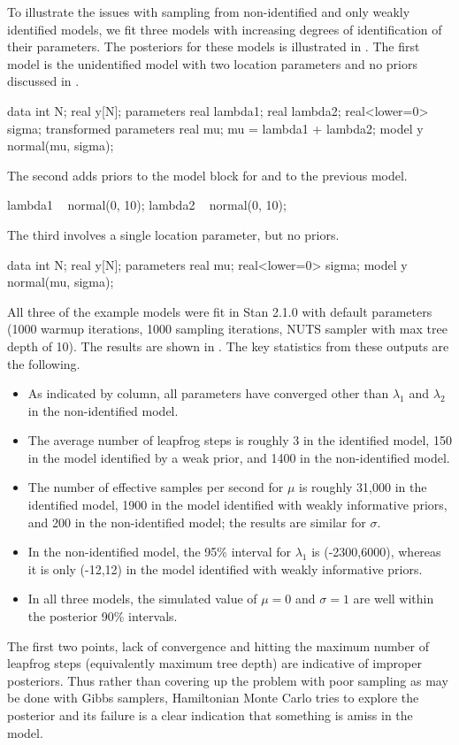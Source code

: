 To illustrate the issues with sampling from non-identified and only
weakly identified models, we fit three models with increasing degrees
of identification of their parameters.  The posteriors for these
models is illustrated in .  The
first model is the unidentified model with two location parameters and
no priors discussed in .
%
\begin{stancode}
data {
  int N;
  real y[N];
}
parameters {
  real lambda1;
  real lambda2;
  real<lower=0> sigma;
}
transformed parameters {
  real mu;
  mu = lambda1 + lambda2;
}
model {
  y ~ normal(mu, sigma);
}
\end{stancode}
%
The second adds priors to the model block for  and
 to the previous model.
%
\begin{stancode}
  lambda1 ~ normal(0, 10);
  lambda2 ~ normal(0, 10);
\end{stancode}
%
The third involves a single location parameter, but no priors.
%
\begin{stancode}
data {
  int N;
  real y[N];
}
parameters {
  real mu;
  real<lower=0> sigma;
}
model {
  y ~ normal(mu, sigma);
}
\end{stancode}
%
All three of the example models were fit in Stan 2.1.0 with default
parameters (1000 warmup iterations, 1000 sampling iterations, NUTS
sampler with max tree depth of 10). The results are shown in
. The key statistics from these
outputs are the following.
%
\begin{itemize}
\item As indicated by  column, all parameters have
  converged other than $\lambda_1$ and $\lambda_2$ in the
  non-identified model.
\item
  The average number of leapfrog steps is roughly 3 in
  the identified model, 150 in the model identified by a weak prior, and
  1400 in the non-identified model.
\item 
  The number of effective samples per
  second for $\mu$ is roughly 31,000 in the identified model, 1900 in the model
  identified with weakly informative priors, and 200 in the
  non-identified model; the results are similar for $\sigma$.  
\item 
  In the non-identified model, the 95\% interval for $\lambda_1$ is
  (-2300,6000), whereas it is only (-12,12) in the model identified with
  weakly informative priors.
\item
  In all three models, the simulated value of $\mu=0$ and $\sigma=1$
  are well within the posterior 90\% intervals.
\end{itemize}
%
The first two points, lack of convergence and hitting the maximum
number of leapfrog steps (equivalently maximum tree depth) are
indicative of improper posteriors.  Thus rather than covering up the
problem with poor sampling as may be done with Gibbs samplers,
Hamiltonian Monte Carlo tries to explore the posterior and its failure
is a clear indication that something is amiss in the model.





